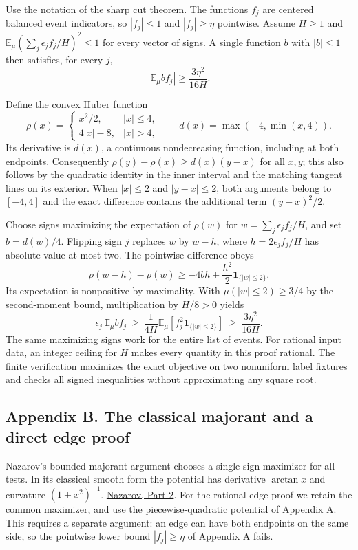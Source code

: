 \documentclass[
  11pt,
]{article}
\begin{document}
Use the notation of the sharp cut theorem. The functions \(f_j\) are
centered balanced event indicators, so \(|f_j|\le1\) and
\(|f_j|\ge\eta\) pointwise. Assume \(H\ge1\) and
\(\mathbb E_\mu(\sum_j\epsilon_j f_j/H)^2\le1\) for every vector of
signs. A single function \(b\) with \(|b|\le1\) then satisfies, for every
\(j\), \[
                 |\mathbb E_\mu b f_j|\ge\frac{3\eta^2}{16H}.
\]

Define the convex Huber function \[
   \rho(x)=
      \begin{cases}
       x^2/2,&|x|\le4,\\
       4|x|-8,&|x|>4 ,
      \end{cases}
   \qquad d(x)=\max(-4,\min(x,4)).
\] Its derivative is \(d(x)\), a continuous nondecreasing function,
including at both endpoints. Consequently
\(\rho(y)-\rho(x)\ge d(x)(y-x)\) for all \(x,y\); this also follows by
the quadratic identity in the inner interval and the matching tangent
lines on its exterior. When \(|x|\le2\) and \(|y-x|\le2\), both
arguments belong to \([-4,4]\) and the exact difference contains the
additional term \((y-x)^2/2\).

Choose signs maximizing the expectation of \(\rho(w)\) for
\(w=\sum_j\epsilon_j f_j/H\), and set \(b=d(w)/4\). Flipping sign \(j\)
replaces \(w\) by \(w-h\), where \(h=2\epsilon_j f_j/H\) has absolute
value at most two. The pointwise difference obeys \[
 \rho(w-h)-\rho(w)\ge -4bh + \frac{h^2}{2}\mathbf1_{\{|w|\le2\}} .
\] Its expectation is nonpositive by maximality. With
\(\mu(|w|\le2)\ge3/4\) by the second-moment bound, multiplication by
\(H/8>0\) yields \[
 \epsilon_j\,\mathbb E_\mu bf_j
       \ \ge\ \frac1{4H}\mathbb E_\mu
                         [f_j^2\mathbf1_{\{|w|\le2\}}]
       \ \ge\ \frac{3\eta^2}{16H}.
\] The same maximizing signs work for the entire list of events. For rational input data, an integer ceiling for \(H\) makes
every quantity in this proof rational. The finite verification maximizes
the exact objective on two nonuniform label fixtures and checks all
signed inequalities without approximating any square root.

\clearpage
\subsection{Appendix B. The classical majorant and a direct edge
proof}\label{appendix-b.-the-classical-majorant-and-a-direct-edge-proof}

Nazarov's bounded-majorant argument chooses a single sign maximizer
for all tests. In its classical smooth form the potential has derivative
\(\arctan x\) and curvature \((1+x^2)^{-1}\).
\href{https://www.mathnet.ru/eng/aa774}{Nazarov, Part 2}.
For the rational edge proof we retain the common maximizer, and use
the piecewise-quadratic potential of Appendix A. This requires a separate
argument: an edge can have both endpoints on the same side, so the
pointwise lower bound \(|f_j|\ge\eta\) of Appendix A fails.
\end{document}
